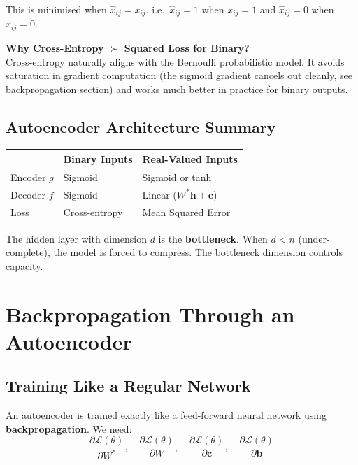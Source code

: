\documentclass[12pt,a4paper]{article}
\newcommand{\vh}{\mathbf{h}}
\newcommand{\vb}{\mathbf{b}}
\newcommand{\vc}{\mathbf{c}}
\newcommand{\Loss}{\mathcal{L}}
\begin{document}
This is minimised when $\hat{x}_{ij} = x_{ij}$, i.e.\ $\hat{x}_{ij}=1$ when $x_{ij}=1$ and $\hat{x}_{ij}=0$ when $x_{ij}=0$.

\begin{keybox}
\textbf{Why Cross-Entropy $\succ$ Squared Loss for Binary?}\\
Cross-entropy naturally aligns with the Bernoulli probabilistic model. It avoids saturation in gradient computation (the sigmoid gradient cancels out cleanly, see backpropagation section) and works much better in practice for binary outputs.
\end{keybox}

\subsection{Autoencoder Architecture Summary}

\begin{center}
\begin{tabular}{lp{5cm}p{5cm}}
\toprule
 & \textbf{Binary Inputs} & \textbf{Real-Valued Inputs} \\
\midrule
Encoder $g$ & Sigmoid & Sigmoid or tanh \\
Decoder $f$ & Sigmoid & Linear ($W^*\vh + \vc$) \\
Loss & Cross-entropy & Mean Squared Error \\
\bottomrule
\end{tabular}
\end{center}

The hidden layer with dimension $d$ is the \textbf{bottleneck}. When $d < n$ (under-complete), the model is forced to compress. The bottleneck dimension controls capacity.

\section{Backpropagation Through an Autoencoder}

\subsection{Training Like a Regular Network}

An autoencoder is trained exactly like a feed-forward neural network using \textbf{backpropagation}. We need:
\[
  \frac{\partial\Loss(\theta)}{\partial W^*},\quad
  \frac{\partial\Loss(\theta)}{\partial W},\quad
  \frac{\partial\Loss(\theta)}{\partial \vc},\quad
  \frac{\partial\Loss(\theta)}{\partial \vb}
\]
\end{document}
